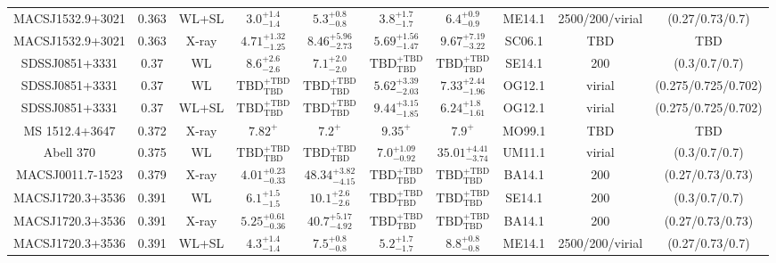 \begin{table}
\begin{tabular}{cccccccccc}
MACSJ1532.9+3021 & 0.363 & WL+SL & ${3.0}^{+1.4}_{-1.4}$ & ${5.3}^{+0.8}_{-0.8}$ & ${3.8}^{+1.7}_{-1.7}$ & ${6.4}^{+0.9}_{-0.9}$ & ME14.1 & 2500/200/virial & (0.27/0.73/0.7) \\
MACSJ1532.9+3021 & 0.363 & X-ray & ${4.71}^{+1.32}_{-1.25}$ & ${8.46}^{+5.96}_{-2.73}$ & ${5.69}^{+1.56}_{-1.47}$ & ${9.67}^{+7.19}_{-3.22}$ & SC06.1 & TBD & TBD \\
SDSSJ0851+3331 & 0.37 & WL & ${8.6}^{+2.6}_{-2.6}$ & ${7.1}^{+2.0}_{-2.0}$ & ${\mathrm{TBD}}^{+\mathrm{TBD}}_{\mathrm{TBD}}$ & ${\mathrm{TBD}}^{+\mathrm{TBD}}_{\mathrm{TBD}}$ & SE14.1 & 200 & (0.3/0.7/0.7) \\
SDSSJ0851+3331 & 0.37 & WL & ${\mathrm{TBD}}^{+\mathrm{TBD}}_{\mathrm{TBD}}$ & ${\mathrm{TBD}}^{+\mathrm{TBD}}_{\mathrm{TBD}}$ & ${5.62}^{+3.39}_{-2.03}$ & ${7.33}^{+2.44}_{-1.96}$ & OG12.1 & virial & (0.275/0.725/0.702) \\
SDSSJ0851+3331 & 0.37 & WL+SL & ${\mathrm{TBD}}^{+\mathrm{TBD}}_{\mathrm{TBD}}$ & ${\mathrm{TBD}}^{+\mathrm{TBD}}_{\mathrm{TBD}}$ & ${9.44}^{+3.15}_{-1.85}$ & ${6.24}^{+1.8}_{-1.61}$ & OG12.1 & virial & (0.275/0.725/0.702) \\
MS 1512.4+3647 & 0.372 & X-ray & ${7.82}^{+}_{}$ & ${7.2}^{+}_{}$ & ${9.35}^{+}_{}$ & ${7.9}^{+}_{}$ & MO99.1 & TBD & TBD \\
Abell 370 & 0.375 & WL & ${\mathrm{TBD}}^{+\mathrm{TBD}}_{\mathrm{TBD}}$ & ${\mathrm{TBD}}^{+\mathrm{TBD}}_{\mathrm{TBD}}$ & ${7.0}^{+1.09}_{-0.92}$ & ${35.01}^{+4.41}_{-3.74}$ & UM11.1 & virial & (0.3/0.7/0.7) \\
MACSJ0011.7-1523 & 0.379 & X-ray & ${4.01}^{+0.23}_{-0.33}$ & ${48.34}^{+3.82}_{-4.15}$ & ${\mathrm{TBD}}^{+\mathrm{TBD}}_{\mathrm{TBD}}$ & ${\mathrm{TBD}}^{+\mathrm{TBD}}_{\mathrm{TBD}}$ & BA14.1 & 200 & (0.27/0.73/0.73) \\
MACSJ1720.3+3536 & 0.391 & WL & ${6.1}^{+1.5}_{-1.5}$ & ${10.1}^{+2.6}_{-2.6}$ & ${\mathrm{TBD}}^{+\mathrm{TBD}}_{\mathrm{TBD}}$ & ${\mathrm{TBD}}^{+\mathrm{TBD}}_{\mathrm{TBD}}$ & SE14.1 & 200 & (0.3/0.7/0.7) \\
MACSJ1720.3+3536 & 0.391 & X-ray & ${5.25}^{+0.61}_{-0.36}$ & ${40.7}^{+5.17}_{-4.92}$ & ${\mathrm{TBD}}^{+\mathrm{TBD}}_{\mathrm{TBD}}$ & ${\mathrm{TBD}}^{+\mathrm{TBD}}_{\mathrm{TBD}}$ & BA14.1 & 200 & (0.27/0.73/0.73) \\
MACSJ1720.3+3536 & 0.391 & WL+SL & ${4.3}^{+1.4}_{-1.4}$ & ${7.5}^{+0.8}_{-0.8}$ & ${5.2}^{+1.7}_{-1.7}$ & ${8.8}^{+0.8}_{-0.8}$ & ME14.1 & 2500/200/virial & (0.27/0.73/0.7) \\

\end{tabular}
\end{table}
